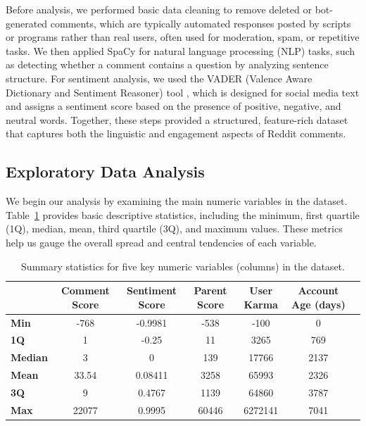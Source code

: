 \documentclass[10pt]{article}
\begin{document}
\noindent Before analysis, we performed basic data cleaning to remove deleted or bot-generated comments, which are typically automated responses posted by scripts or programs rather than real users, often used for moderation, spam, or repetitive tasks. We then applied SpaCy \cite{spacy2023} for natural language processing (NLP) tasks, such as detecting whether a comment contains a question by analyzing sentence structure. For sentiment analysis, we used the VADER (Valence Aware Dictionary and Sentiment Reasoner) tool \cite{hutto2014}, which is designed for social media text and assigns a sentiment score based on the presence of positive, negative, and neutral words. Together, these steps provided a structured, feature-rich dataset that captures both the linguistic and engagement aspects of Reddit comments.


\subsection{Exploratory Data Analysis}

We begin our analysis by examining the main numeric variables in the dataset. Table~\ref{tab:summary-stats} provides basic descriptive statistics, including the minimum, first quartile (1Q), median, mean, third quartile (3Q), and maximum values. These metrics help us gauge the overall spread and central tendencies of each variable.

\begin{table}[H]
\centering
\begin{tabular}{lcccccc}
\toprule
& \textbf{Comment Score} & \textbf{Sentiment Score} & \textbf{Parent Score} & \textbf{User Karma} & \textbf{Account Age (days)} \\
\midrule
\textbf{Min}  & -768    & -0.9981 & -538    & -100     & 0    \\
\textbf{1Q}   & 1       & -0.25   & 11      & 3265     & 769  \\
\textbf{Median} & 3     & 0       & 139     & 17766    & 2137 \\
\textbf{Mean}   & 33.54 & 0.08411 & 3258    & 65993    & 2326 \\
\textbf{3Q}   & 9       & 0.4767  & 1139    & 64860    & 3787 \\
\textbf{Max}  & 22077   & 0.9995  & 60446   & 6272141  & 7041 \\
\bottomrule
\end{tabular}
\caption{Summary statistics for five key numeric variables (columns) in the dataset.}
\label{tab:summary-stats}
\end{table}
\end{document}
